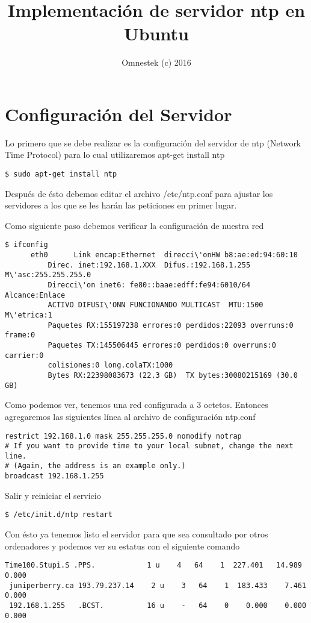 \documentclass{article}
\author{Omnestek (c) 2016}
\title{Implementaci\'on de servidor ntp en Ubuntu}
\begin{document}
\maketitle
\section{Configuraci\'on del Servidor}
Lo primero que se debe realizar es la configuraci\'on del servidor de ntp (Network Time Protocol) para lo cual utilizaremos apt-get install ntp
\begin{verbatim}
$ sudo apt-get install ntp
\end{verbatim}
Despu\'es de \'esto debemos editar el archivo /etc/ntp.conf para ajustar los servidores a los que se les har\'an las peticiones en primer lugar.

Como siguiente paso debemos verificar la configuraci\'on de nuestra red

\begin{verbatim}
$ ifconfig
	  eth0      Link encap:Ethernet  direcci\'onHW b8:ae:ed:94:60:10  
          Direc. inet:192.168.1.XXX  Difus.:192.168.1.255  M\'asc:255.255.255.0
          Direcci\'on inet6: fe80::baae:edff:fe94:6010/64 Alcance:Enlace
          ACTIVO DIFUSI\'ONN FUNCIONANDO MULTICAST  MTU:1500  M\'etrica:1
          Paquetes RX:155197238 errores:0 perdidos:22093 overruns:0 frame:0
          Paquetes TX:145506445 errores:0 perdidos:0 overruns:0 carrier:0
          colisiones:0 long.colaTX:1000 
          Bytes RX:22398083673 (22.3 GB)  TX bytes:30080215169 (30.0 GB)
\end{verbatim}
Como podemos ver, tenemos una red configurada a 3 octetos. Entonces agregaremos las siguientes l\'inea al archivo de configuraci\'on ntp.conf
\begin{verbatim}
restrict 192.168.1.0 mask 255.255.255.0 nomodify notrap
# If you want to provide time to your local subnet, change the next line.
# (Again, the address is an example only.)
broadcast 192.168.1.255
\end{verbatim}
Salir y reiniciar el servicio
\begin{verbatim}
$ /etc/init.d/ntp restart
\end{verbatim}
Con \'esto ya tenemos listo el servidor para que sea consultado por otros ordenadores y podemos ver su estatus con el siguiente comando
\begin{verbatim}
Time100.Stupi.S .PPS.            1 u    4   64    1  227.401   14.989   0.000
 juniperberry.ca 193.79.237.14    2 u    3   64    1  183.433    7.461   0.000
 192.168.1.255   .BCST.          16 u    -   64    0    0.000    0.000   0.000
 \end{verbatim}
\end{document}
